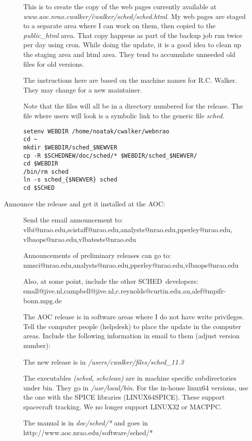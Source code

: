 \documentclass{report}
\newcommand{\schedb}{{\sc SCHED~}}
\begin{document}
\begin{description}
This is to create the copy of the web pages currently available at
{\sl www.aoc.nrao.cwalker/\~cwalker/sched/sched.html}.  My web pages
are staged to a separate area where I can work on them, then copied to
the {\sl public\_html} area.  That copy happens as part of the backup
job run twice per day using cron.  While doing the update, it is a
good idea to clean up the staging area and html area.  They tend to
accumulate unneeded old files for old versions.

The instructions here are based on the machine names for R.C. Walker.
They may change for a new maintainer.

Note that the files will all be in a directory numbered for the
release.  The file where users will look is a symbolic link to the
generic file {\sl sched}.

\begin{verbatim}
setenv WEBDIR /home/noatak/cwalker/webnrao
cd ~
mkdir $WEBDIR/sched_$NEWVER
cp -R $SCHEDNEW/doc/sched/* $WEBDIR/sched_$NEWVER/
cd $WEBDIR
/bin/rm sched
ln -s sched_{$NEWVER} sched
cd $SCHED
\end{verbatim}


\item [Announce the release and get it installed at the AOC:]

Send the email announcement to:
vlbi@nrao.edu,scistaff@nrao.edu,analysts@nrao.edu,pperley@nrao.edu,
vlbaops@nrao.edu,vlbatests@nrao.edu

Announcements of preliminary releases can go to:
nmsci@nrao.edu,analysts@nrao.edu,pperley@nrao.edu,vlbaops@nrao.edu

Also, at some point, include the other \schedb developers:
small@jive.nl,campbell@jive.nl,c.reynolds@curtin.edu.au,alef@mpifr-bonn.mpg.de

The AOC release is in software areas where I do not have write
privileges.  Tell the computer people (helpdesk) to place the update
in the computer areas.  Include the following information in email to
them (adjust version number):

The new release is in {\sl /users/cwalker/files/sched\_11.3}

The executables {\sl (sched, schclean)} are in machine specific
subdirectories under bin.  They go in {\sl /usr/local/bin}.  For the
in-house linux64 versions, use the one with the SPICE libraries
(LINUX64SPICE). These support spacecraft tracking.  We no longer
support LINUX32 or MACPPC.

The manual is in {\sl doc/sched/*} and goes in
http://www.aoc.nrao.edu/software/sched/*


\end{description}
\end{document}
